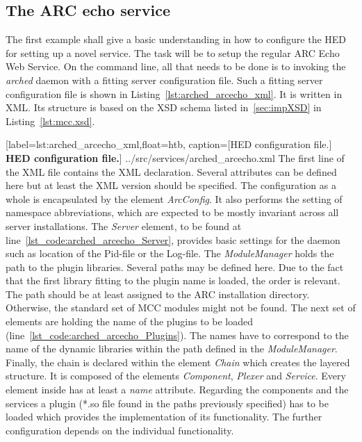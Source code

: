 \subsection{The ARC echo service}


The first example shall give a basic understanding in how to configure the HED for setting up a novel service.
The task will be to setup the regular ARC Echo Web Service.
On the command line, all that needs to be done is to invoking the \textit{arched} daemon with a fitting server configuration file.
Such a fitting server configuration file is shown in Listing~\ref{lst:arched_arcecho_xml}.
It is written in XML. Its structure is based on the XSD schema listed in~\ref{sec:impXSD} in Listing~\ref{lst:mcc.xsd}.\\ 


	[label=lst:arched_arcecho_xml,float=htb,
	caption={[HED configuration file.]
	\textbf{HED configuration file.}}]
{../src/services/arched_arcecho.xml}
The first line of the XML file contains the XML declaration.
Several attributes can be defined here but at least the XML version should be specified.
The configuration as a whole is encapsulated by the element \textit{ArcConfig}. It also performs the setting of namespace abbreviations, which are expected to be mostly invariant across all server installations.%
The \textit{Server} element, to be found at line~\ref{lst_code:arched_arcecho_Server}, provides basic settings for the daemon such as location of the Pid-file or the Log-file.
The \textit{ModuleManager} holds the path to the plugin libraries.
Several paths may be defined here.
Due to the fact that the first library fitting to the plugin name is loaded, the order is relevant.
The path should be at least assigned to the ARC installation directory.
Otherwise, the standard set of MCC modules might not be found.
The next set of elements are holding the name of the plugins to be loaded (line~\ref{lst_code:arched_arcecho_Plugins}).
The names have to correspond to the name of the dynamic libraries within the path defined in the \textit{ModuleManager}.
Finally, the chain is declared within the element \textit{Chain} which creates the layered structure.
It is composed of the elements \textit{Component}, \textit{Plexer} and \textit{Service}.
Every element inside has at least a \textit{name} attribute.
Regarding the components and the services a plugin (*.so file found in the paths previously specified) has to be loaded which provides the implementation of its functionality. The further configuration depends on the individual functionality.\\
